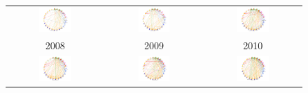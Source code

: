 \begin{figure}[H]
	\begin{tabular}{ccc}
		\includegraphics[width=0.35\textwidth]{Imagens/rede-2008.pdf} &   \includegraphics[width=0.35\textwidth]{Imagens/rede-2009.pdf} &
		\includegraphics[width=0.35\textwidth]{Imagens/rede-2010.pdf}\\
		2008 & 2009 & 2010\\[6pt] 
		\includegraphics[width=0.35\textwidth]{Imagens/rede-2011.pdf} &
		\includegraphics[width=0.35\textwidth]{Imagens/rede-2012.pdf} &   \includegraphics[width=0.35\textwidth]{Imagens/rede-2013.pdf} \\

\end{tabular}
\end{figure}
